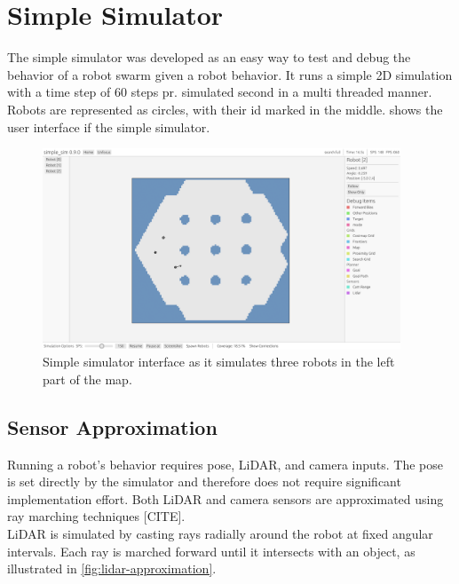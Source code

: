 
\section{Simple Simulator}
The simple simulator was developed as an easy way to test and debug the behavior of a robot swarm given a robot behavior. It runs a simple 2D simulation with a time step of 60 steps pr. simulated second in a multi threaded manner. Robots are represented as circles, with their id marked in the middle. 
 shows the user interface if the simple simulator.

\begin{figure}[H]
    \begin{center}
        \includegraphics[width=0.95\textwidth]{figures/simple-sim-gui.png}
    \end{center}
    \caption{Simple simulator interface as it simulates three robots in the left part of the map.}\label{fig:simple-sim-interface}
\end{figure}

\subsection{Sensor Approximation}
Running a robot's behavior requires pose, LiDAR, and camera inputs. The pose is set directly by the simulator and therefore does not require significant implementation effort. Both LiDAR and camera sensors are approximated using ray marching techniques {\color{red}[CITE]}. \\

LiDAR is simulated by casting rays radially around the robot at fixed angular intervals. Each ray is marched forward until it intersects with an object, as illustrated in \cref{fig:lidar-approximation}. \\

